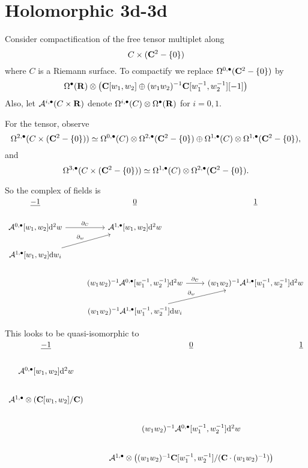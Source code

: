 \documentclass[11pt]{amsart}
\begin{document}
\section{Holomorphic 3d-3d}

Consider compactification of the free tensor multiplet along
\begin{equation}
C \times (\mathbf{C}^2 - \{0\})
\end{equation}
where $C$ is a Riemann surface.
To compactify we replace $\Omega^{0,\bullet}(\mathbf{C}^2 - \{0\})$ by
\begin{equation}
\Omega^{\bullet}(\mathbf{R}) \otimes \left(\mathbf{C}[w_1,w_2] \oplus (w_1 w_2)^{-1}\mathbf{C}[w_1^{-1},w_2^{-1}][-1] \right)
\end{equation}
Also, let $\mathcal A^{i,\bullet}(C \times \mathbf{R})$ denote $\Omega^{i,\bullet}(C) \otimes \Omega^\bullet(\mathbf{R})$ for $i=0,1$.

For the tensor, observe
\begin{equation}
\Omega^{2,\bullet}(C \times (\mathbf{C}^2 - \{0\})) \simeq \Omega^{0,\bullet}(C) \otimes \Omega^{2,\bullet}(\mathbf{C}^2 -\{0\}) \oplus \Omega^{1,\bullet}(C) \otimes \Omega^{1,\bullet}(\mathbf{C}^2 - \{0\}) ,
\end{equation}
and 
\begin{equation}
\Omega^{3,\bullet}(C \times (\mathbf{C}^2 - \{0\})) \simeq \Omega^{1,\bullet}(C) \otimes \Omega^{2,\bullet}(\mathbf{C}^2 - \{0\}) .
\end{equation}

So the complex of fields is
\begin{equation}
\begin{tikzcd}
\ul{-1} & \ul{0} & \ul{1} \\
\cA^{0,\bu} [w_1,w_2] \d^2 w \ar[r,"\del_C"] & \cA^{1,\bu}[w_1,w_2] \d^2 w & \\
\cA^{1,\bu}[w_1,w_2] \d w_i \ar[ur,"\del_w"] & & \\
& (w_1w_2)^{-1}\cA^{0,\bu} [w_1^{-1},w_2^{-1}] \d^2 w \ar[r,"\del_C"] & (w_1w_2)^{-1}\cA^{1,\bu}[w_1^{-1},w_2^{-1}] \d^2 w \\
& (w_1 w_2)^{-1}\cA^{1,\bu}[w_1^{-1},w_2^{-1}] \d w_i \ar[ur,"\del_w"] & 
\end{tikzcd}
\end{equation}

This looks to be quasi-isomorphic to
\begin{equation}
\begin{tikzcd}
\ul{-1} & \ul{0} & \ul{1} \\
\cA^{0,\bu} [w_1,w_2] \d^2 w & & \\
\cA^{1,\bu} \otimes (\C[w_1,w_2] \slash \C) & & \\
& (w_1w_2)^{-1}\cA^{0,\bu} [w_1^{-1},w_2^{-1}] \d^2 w & \\
& \cA^{1,\bu} \otimes \left( (w_1 w_2)^{-1} \C[w_1^{-1},w_2^{-1}] / (\C \cdot (w_1 w_2)^{-1}) \right)  & 
\end{tikzcd}
\end{equation}
\end{document}
